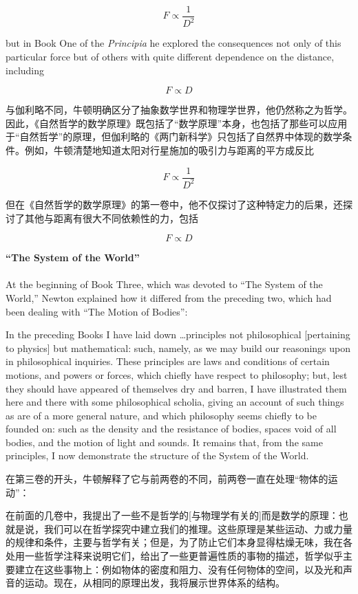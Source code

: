 \documentclass{article}
\begin{document}
\[
F \propto \frac{1}{D^2}
\]

\noindent but in Book One of the \textit{Principia} he explored the consequences not only of this particular force but of others with quite different dependence on the distance, including

\[
F \propto D
\]

与伽利略不同，牛顿明确区分了抽象数学世界和物理学世界，他仍然称之为哲学。因此，《自然哲学的数学原理》既包括了“数学原理”本身，也包括了那些可以应用于“自然哲学”的原理，但伽利略的《两门新科学》只包括了自然界中体现的数学条件。例如，牛顿清楚地知道太阳对行星施加的吸引力与距离的平方成反比

\[
F \propto \frac{1}{D^2}
\]

\noindent 但在《自然哲学的数学原理》的第一卷中，他不仅探讨了这种特定力的后果，还探讨了其他与距离有很大不同依赖性的力，包括

\[
F \propto D
\]

\noindent\textbf{“The System of the World”}\\
\\
At the beginning of Book Three, which was devoted to ``The System of the World,'' Newton explained how it differed from the preceding two, which had been dealing with ``The Motion of Bodies'':

\addtolength{\leftskip}{1cm}

In the preceding Books I have laid down \ldots principles not philosophical [pertaining to physics] but mathematical: such, namely, as we may build our reasonings upon in philosophical inquiries. These principles are laws and conditions of certain motions, and powers or forces, which chiefly have respect to philosophy; but, lest they should have appeared of themselves dry and barren, I have illustrated them here and there with some philosophical scholia, giving an account of such things as are of a more general nature, and which philosophy seems chiefly to be founded on: such as the density and the resistance of bodies, spaces void of all bodies, and the motion of light and sounds. It remains that, from the same principles, I now demonstrate the structure of the System of the World.\\

\addtolength{\leftskip}{-1cm}

\noindent 在第三卷的开头，牛顿解释了它与前两卷的不同，前两卷一直在处理“物体的运动”：

\addtolength{\leftskip}{1cm}

在前面的几卷中，我提出了一些不是哲学的[与物理学有关的]而是数学的原理：也就是说，我们可以在哲学探究中建立我们的推理。这些原理是某些运动、力或力量的规律和条件，主要与哲学有关；但是，为了防止它们本身显得枯燥无味，我在各处用一些哲学注释来说明它们，给出了一些更普遍性质的事物的描述，哲学似乎主要建立在这些事物上：例如物体的密度和阻力、没有任何物体的空间，以及光和声音的运动。现在，从相同的原理出发，我将展示世界体系的结构。\\
\end{document}
